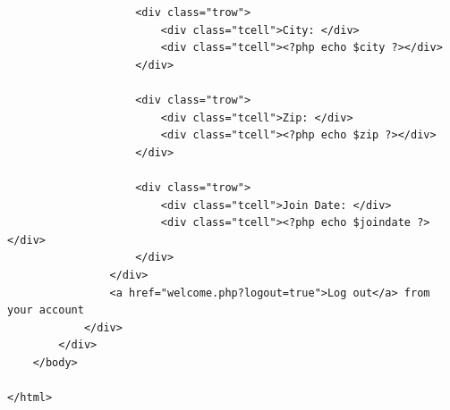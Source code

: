 \documentclass{article}
\begin{document}
\begin{verbatim}
                    <div class="trow">
                        <div class="tcell">City: </div>
                        <div class="tcell"><?php echo $city ?></div>
                    </div>

                    <div class="trow">
                        <div class="tcell">Zip: </div>
                        <div class="tcell"><?php echo $zip ?></div>
                    </div>
                    
                    <div class="trow">
                        <div class="tcell">Join Date: </div>
                        <div class="tcell"><?php echo $joindate ?></div>
                    </div>
                </div>
                <a href="welcome.php?logout=true">Log out</a> from your account
            </div>
		</div>
	</body>

</html>
\end{verbatim}
\newpage
\end{document}
